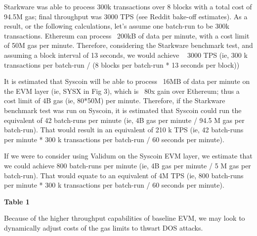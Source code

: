 \documentclass[peerreview]{ieeesyscoin}
\begin{document}
Starkware was able to process 300k transactions over 8 blocks with a total cost of 94.5M gas; final throughput was 3000 TPS (see Reddit bake-off estimates). As a result, or the following calculations, let’s assume one batch-run to be 300k transactions.
Ethereum can process ~200kB of data per minute, with a cost limit of 50M gas per minute. Therefore, considering the Starkware benchmark test, and assuming a block interval of 13 seconds, we would achieve ~ 3000 TPS (ie,  300 k transactions per batch-run / (8 blocks per batch-run * 13 seconds per block))

It is estimated that Syscoin will be able to process ~16MB of data per minute on the EVM layer (ie, SYSX in Fig 3), which is ~80x gain over Ethereum; thus a cost limit of 4B gas (ie, 80*50M) per minute. Therefore, if the Starkware benchmark test was run on Syscoin, it is estimated that Syscoin could run the equivalent of 42 batch-runs per minute (ie, 4B gas per minute / 94.5 M gas per batch-run). That would result in an equivalent of 210 k TPS (ie, 42 batch-runs per minute * 300 k transactions per batch-run / 60 seconds per minute).

If we were to consider using Validum on the Syscoin EVM layer, we estimate that we could achieve 800 batch-runs per minute (ie, 4B gas per minute / 5 M gas per batch-run). That would equate to an equivalent of 4M TPS (ie, 800 batch-runs per minute * 300 k transactions per batch-run / 60 seconds per minute).

\textbf{Table 1}

Because of the higher throughput capabilities of baseline EVM, we may look to dynamically adjust costs of the gas limits \cite{Che17} to thwart DOS attacks.
\end{document}
